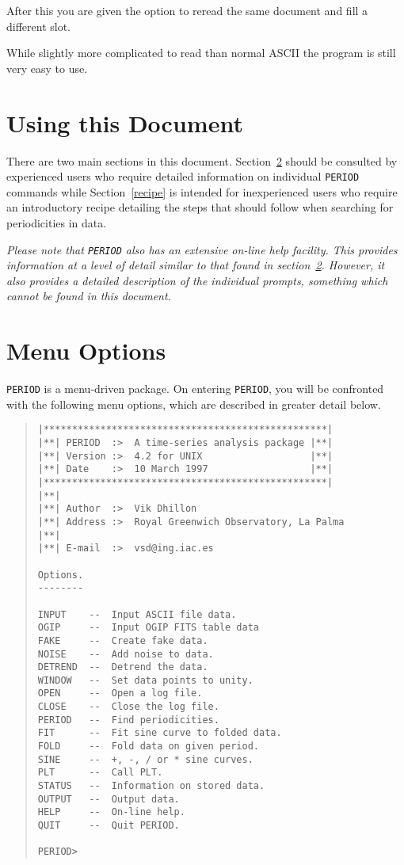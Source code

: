After this you are given the option to reread the same document and fill a 
different slot.

While slightly more complicated to read than normal ASCII the 
program is still very easy to use.

\section{Using this Document}

There are two main sections in this document.  Section~\ref{menu}
should be consulted by experienced users who require detailed
information on individual {\tt PERIOD} commands while
Section~\ref{recipe} is intended for inexperienced users who require an
introductory recipe detailing the steps that should follow when
searching for periodicities in data.

{\em Please note that {\tt PERIOD} also has an extensive on-line help
facility.  This provides information at a level of detail similar to
that found in section~\ref{menu}. However, it also provides a detailed
description of the individual prompts, something which cannot be found
in this document.}

\section{Menu Options}
\label{menu}

{\tt PERIOD} is a menu-driven package. On entering {\tt PERIOD}, you will be
confronted with the following menu options, which are described in greater
detail below.

\begin{quote}
\begin{verbatim}
|**************************************************|
|**| PERIOD  :>  A time-series analysis package |**|
|**| Version :>  4.2 for UNIX                   |**|
|**| Date    :>  10 March 1997                  |**|
|**************************************************|
|**|
|**| Author  :>  Vik Dhillon
|**| Address :>  Royal Greenwich Observatory, La Palma
|**| 
|**| E-mail  :>  vsd@ing.iac.es
 
Options.
--------

INPUT    --  Input ASCII file data.
OGIP     --  Input OGIP FITS table data 
FAKE     --  Create fake data.
NOISE    --  Add noise to data.
DETREND  --  Detrend the data.
WINDOW   --  Set data points to unity.
OPEN     --  Open a log file.
CLOSE    --  Close the log file.
PERIOD   --  Find periodicities.
FIT      --  Fit sine curve to folded data.
FOLD     --  Fold data on given period.
SINE     --  +, -, / or * sine curves.
PLT      --  Call PLT.
STATUS   --  Information on stored data.
OUTPUT   --  Output data.
HELP     --  On-line help.
QUIT     --  Quit PERIOD.

PERIOD> 
\end{verbatim}
\end{quote}

